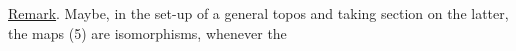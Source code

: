 \uline{Remark}. Maybe, in the set-up of a general topos  and taking section on
the latter, the maps (5) are isomorphisms, whenever the 


